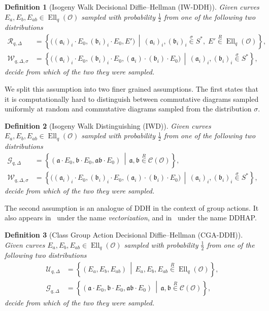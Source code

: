 \documentclass{article}
\newcommand{\Cl}{\mathcal{C}}
\renewcommand{\O}{\mathcal{O}}
\newcommand{\suchthat}{\,\middle\vert\,}
\renewcommand{\frak}{\mathfrak}
\newcommand{\rand}[1]{\overset{#1}{∈}}
\newcommand{\uni}{\rand{R}}
\newtheorem{definition}{Definition}[section]
\theoremstyle{definition}
\DeclareMathOperator{\Ell}{Ell}
\begin{document}
\begin{definition}[Isogeny Walk Decisional Diffie--Hellman (IW-DDH)]
  Given curves $E_a,E_b,E_{ab}∈\Ell_q(\O)$ sampled with probability
  $\frac{1}{2}$ from one of the following two distributions
  \begin{align*}
    \mathcal{R}_{q,Δ} &= \left\{\bigl((\frak a_i)_i·E_0,(\frak b_i)_i·E_0,E'\bigr) \suchthat
                        (\frak a_i)_i,(\frak b_i)_i\rand{σ}S^*,\;
                        E'\uni\Ell_q(\O)\right\},\\
    \mathcal{W}_{q,Δ,σ} &= \left\{\bigl((\frak a_i)_i·E_0,(\frak b_i)_i·E_0,(\frak a_i)·(\frak b_i)·E_0\bigr) \suchthat
                          (\frak a_i)_i,(\frak b_i)_i\rand{σ}S^*\right\},
  \end{align*}
  decide from which of the two they were sampled.
\end{definition}

We split this assumption into two finer grained assumptions. The first
states that it is computationally hard to distinguish between
commutative diagrams sampled uniformly at random and commutative
diagrams sampled from the distribution $σ$.

\begin{definition}[Isogeny Walk Distinguishing (IWD)]
  Given curves $E_a,E_b,E_{ab}∈\Ell_q(\O)$ sampled with probability
  $\frac{1}{2}$ from one of the following two distributions
  \begin{align*}
    \mathcal{G}_{q,Δ} &= \left\{(\frak a·E_0,\frak b·E_0,\frak{ab}·E_0) \suchthat
                        \frak a,\frak b\uni\Cl(\O)\right\},\\
    \mathcal{W}_{q,Δ,σ} &= \left\{\bigl((\frak a_i)_i·E_0,(\frak b_i)_i·E_0,(\frak a_i)·(\frak b_i)·E_0\bigr) \suchthat
                          (\frak a_i)_i,(\frak b_i)_i\rand{σ}S^*\right\},
  \end{align*}
  decide from which of the two they were sampled.
\end{definition}

The second assumption is an analogue of DDH in the context of group
actions. It also appears in~\cite{cryptoeprint:2006:291} under the
name \emph{vectorization}, and in~\cite{Stol,Stolbunov2012} under the
name DDHAP.
 
\begin{definition}[Class Group Action Decisional Diffie--Hellman (CGA-DDH)]
  Given curves $E_a,E_b,E_{ab}∈\Ell_q(\O)$ sampled with probability
  $\frac{1}{2}$ from one of the following two distributions
  \begin{align*}
    \mathcal{U}_{q,Δ} &= \left\{(E_a,E_b,E_{ab}) \suchthat E_a,E_b,E_{ab}\uni\Ell_q(\O)\right\},\\
    \mathcal{G}_{q,Δ} &= \left\{(\frak a·E_0,\frak b·E_0,\frak{ab}·E_0) \suchthat
                        \frak a,\frak b\uni\Cl(\O)\right\},
  \end{align*}
  decide from which of the two they were sampled.
\end{definition}
\end{document}
